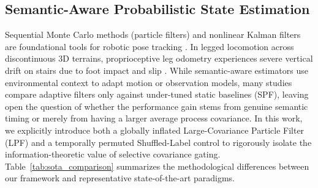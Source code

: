 \documentclass[11pt, a4paper]{article}
\begin{document}
\subsection{Semantic-Aware Probabilistic State Estimation}
Sequential Monte Carlo methods (particle filters) and nonlinear Kalman filters are foundational tools for robotic pose tracking \cite{thrun2005probabilistic, cadena2016past}. In legged locomotion across discontinuous 3D terrains, proprioceptive leg odometry experiences severe vertical drift on stairs due to foot impact and slip \cite{miki2022learning, muse2025}. While semantic-aware estimators use environmental context to adapt motion or observation models, many studies compare adaptive filters only against under-tuned static baselines (SPF), leaving open the question of whether the performance gain stems from genuine semantic timing or merely from having a larger average process covariance. In this work, we explicitly introduce both a globally inflated Large-Covariance Particle Filter (LPF) and a temporally permuted Shuffled-Label control to rigorously isolate the information-theoretic value of selective covariance gating. Table~\ref{tab:sota_comparison} summarizes the methodological differences between our framework and representative state-of-the-art paradigms.
\end{document}
